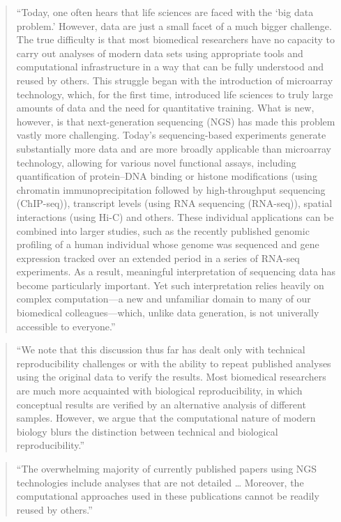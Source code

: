 \documentclass[]{tufte-book}
\begin{document}
\begin{quote}
``Today, one often hears that life sciences are faced with the `big data problem.'
However, data are just a small facet of a much bigger challenge. The true
difficulty is that most biomedical researchers have no capacity to carry out
analyses of modern data sets using appropriate tools and computational infrastructure
in a way that can be fully understood and reused by others. This struggle began with
the introduction of microarray technology, which, for the first time, introduced
life sciences to truly large amounts of data and the need for quantitative training.
What is new, however, is that next-generation sequencing (NGS) has made this problem
vastly more challenging. Today's sequencing-based experiments generate substantially
more data and are more broadly applicable than microarray technology, allowing for
various novel functional assays, including quantification of protein--DNA binding or
histone modifications (using chromatin immunoprecipitation followed by high-throughput
sequencing (ChIP-seq)), transcript levels (using RNA sequencing (RNA-seq)), spatial
interactions (using Hi-C) and others. These individual applications can be combined
into larger studies, such as the recently published genomic profiling of a human
individual whose genome was sequenced and gene expression tracked over an extended
period in a series of RNA-seq experiments. As a result, meaningful interpretation
of sequencing data has become particularly important. Yet such interpretation
relies heavily on complex computation---a new and unfamiliar domain to many of our
biomedical colleagues---which, unlike data generation, is not univerally
accessible to everyone.'' \citep{nekrutenko2012next}
\end{quote}

\begin{quote}
``We note that this discussion thus far has dealt only with technical reproducibility
challenges or with the ability to repeat published analyses using the original data
to verify the results. Most biomedical researchers are much more acquainted with
biological reproducibility, in which conceptual results are verified by an
alternative analysis of different samples. However, we argue that the computational
nature of modern biology blurs the distinction between technical and biological
reproducibility.'' \citep{nekrutenko2012next}
\end{quote}

\begin{quote}
``The overwhelming majority of currently published papers using NGS technologies include
analyses that are not detailed \ldots{} Moreover, the computational approaches used in these
publications cannot be readily reused by others.'' \citep{nekrutenko2012next}
\end{quote}
\end{document}
